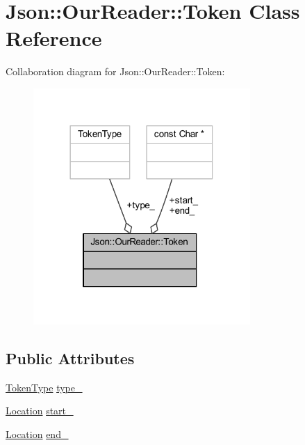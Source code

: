 \hypertarget{class_json_1_1_our_reader_1_1_token}{}\section{Json\+:\+:Our\+Reader\+:\+:Token Class Reference}
\label{class_json_1_1_our_reader_1_1_token}


Collaboration diagram for Json\+:\+:Our\+Reader\+:\+:Token\+:\nopagebreak
\begin{figure}[H]
\begin{center}
\leavevmode
\includegraphics[width=234pt]{class_json_1_1_our_reader_1_1_token__coll__graph}
\end{center}
\end{figure}
\subsection*{Public Attributes}
\begin{DoxyCompactItemize}
\item 
\hyperlink{class_json_1_1_our_reader_a15116f7276ddf1e7a2cc3cbefa884dcc}{Token\+Type} \hyperlink{class_json_1_1_our_reader_1_1_token_abe7d858530396fa7e1293f7a579880ed}{type\+\_\+}
\item 
\hyperlink{class_json_1_1_our_reader_a1bdc7bbc52ba87cae6b19746f2ee0189}{Location} \hyperlink{class_json_1_1_our_reader_1_1_token_aedf68bb00eaaa9d3c22b9825999602ac}{start\+\_\+}
\item 
\hyperlink{class_json_1_1_our_reader_a1bdc7bbc52ba87cae6b19746f2ee0189}{Location} \hyperlink{class_json_1_1_our_reader_1_1_token_a67d2071638add857528579ae3791eccc}{end\+\_\+}
\end{DoxyCompactItemize}



